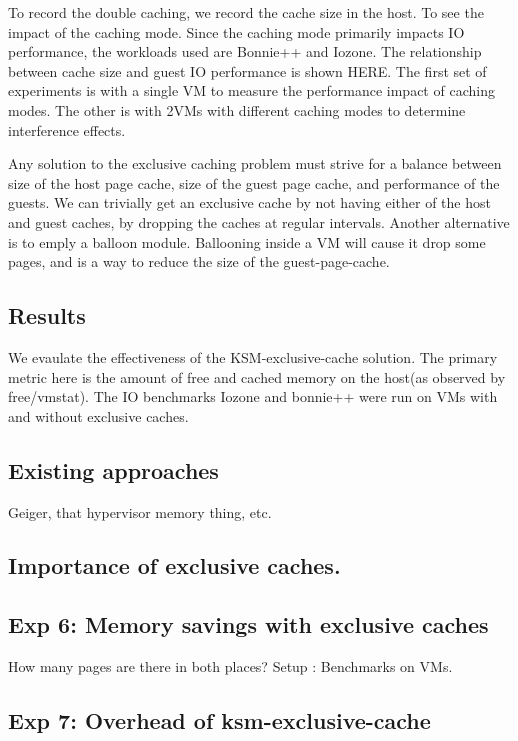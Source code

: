 \documentclass[10pt,a4paper]{article}
\begin{document}
To record the double caching, we record the cache size in the host. To see the impact of the caching mode. Since the caching mode primarily impacts IO performance, the workloads used are Bonnie++ and Iozone. The relationship between cache size and guest IO performance is shown HERE. 
The first set of experiments is with a single VM to measure the performance impact of caching modes.
The other is with 2VMs with different caching modes to determine interference effects. 


Any solution to the exclusive caching problem must strive for a balance between size of the host page cache, size of the guest page cache, and performance of the guests. 
We can trivially get an exclusive cache by not having either of the host and guest caches, by dropping the caches at regular intervals.
Another alternative is to emply a balloon module. Ballooning inside a VM will cause it drop some pages, and is a way to reduce the size of the guest-page-cache.


\subsection{Results}
We evaulate the effectiveness of the KSM-exclusive-cache solution. The primary metric here is the amount of free and cached memory on the host(as observed by free/vmstat). 
The IO benchmarks Iozone and bonnie++ were run on VMs with and without exclusive caches. 

\subsection{Existing approaches}

Geiger, that hypervisor memory thing, etc.
\subsection{Importance of exclusive caches.}

\subsection{Exp 6: Memory savings with exclusive caches}

How many pages are there in both places?
Setup : Benchmarks on VMs.

\subsection{Exp 7: Overhead of ksm-exclusive-cache}
\end{document}
